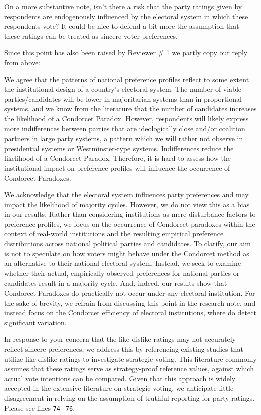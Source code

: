 \documentclass[a4paper, 12pt]{scrartcl}
\theoremstyle{break}
\newenvironment{changes}{\par\color{violet}\par\addvspace{\baselineskip}}{\par\addvspace{\baselineskip}}
\begin{document}
\begin{changes}
On a more substantive note, isn’t there a risk that the party ratings given by respondents are endogenously influenced by the electoral system in which these respondents vote? It could be nice to defend a bit more the assumption that these ratings can be treated as sincere voter preferences.
\end{changes}
Since this point has also been raised by Reviewer \# 1 we partly copy our reply from above: 

We agree that the patterns of national preference profiles reflect to some extent the institutional design of a country's electoral system. The number of viable parties/candidates will be lower in majoritarian systems than in proportional systems, and we know from the literature that the number of candidates increases the likelihood of a Condorcet Paradox. However, respondents will likely express more indifferences between parties that are ideologically close and/or coalition partners in large party systems, a pattern which we will rather not observe in presidential systems or Westminster-type systems. Indifferences reduce the likelihood of a Condorcet Paradox. Therefore, it is hard to assess how the institutional impact on preference profiles will influence the occurrence of Condorcet Paradoxes. 

We acknowledge that the electoral system influences party preferences and may impact the likelihood of majority cycles. However, we do not view this as a bias in our results. Rather than considering institutions as mere disturbance factors to preference profiles, we focus on the occurrence of Condorcet paradoxes within the context of real-world institutions and the resulting empirical preference distributions across national political parties and candidates. To clarify, our aim is not to speculate on how voters might behave under the Condorcet method as an alternative to their national electoral system. Instead, we seek to examine whether their actual, empirically observed preferences for national parties or candidates result in a majority cycle. And, indeed, our results show that Condorcet Paradoxes do practically not occur under any electoral institution. For the sake of brevity, we refrain from discussing this point in the research note, and instead focus on the Condorcet efficiency of electoral institutions, where do detect significant variation.

In response to your concern that the like-dislike ratings may not accurately reflect sincere preferences, we address this by referencing existing studies that utilize like-dislike ratings to investigate strategic voting. This literature commonly assumes that these ratings serve as strategy-proof reference values, against which actual vote intentions can be compared. Given that this approach is widely accepted in the extensive literature on strategic voting, we anticipate little disagreement in relying on the assumption of truthful reporting for party ratings. Please see lines \texttt{74$-$76}. 
\end{document}
